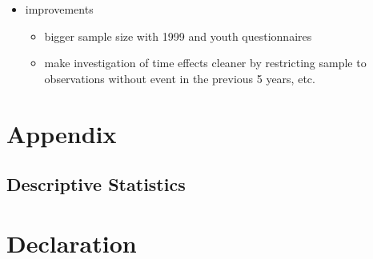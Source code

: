 \documentclass[12pt, a4paper, fleqn, parskip]{scrartcl}
\begin{document}
\begin{itemize}
	\item improvements
	\begin{itemize}
		\item bigger sample size with 1999 and youth questionnaires
		\item make investigation of time effects cleaner by restricting sample
		to observations without event in the previous 5 years, etc.
	\end{itemize}
\end{itemize}

\printbibliography

\appendix
\setcounter{secnumdepth}{0}
\section{Appendix}

\subsection{Descriptive Statistics} %
\label{sub:descriptive_statistics}

















\newpage
\setcounter{secnumdepth}{0}
\section{Declaration}
\end{document}
